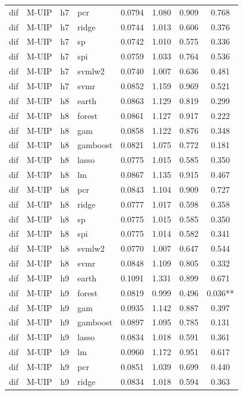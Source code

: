\begin{ThreePartTable}
\begin{longtable}[t]{llclcccc}
dif & M-UIP & h7 & pcr & 0.0794 & 1.080 & 0.909 & 0.768\\
dif & M-UIP & h7 & ridge & 0.0744 & 1.013 & 0.606 & 0.376\\
dif & M-UIP & h7 & sp & 0.0742 & 1.010 & 0.575 & 0.336\\
dif & M-UIP & h7 & spi & 0.0759 & 1.033 & 0.764 & 0.536\\
dif & M-UIP & h7 & svmlw2 & 0.0740 & 1.007 & 0.636 & 0.481\\
dif & M-UIP & h7 & svmr & 0.0852 & 1.159 & 0.969 & 0.521\\
\addlinespace
dif & M-UIP & h8 & earth & 0.0863 & 1.129 & 0.819 & 0.299\\
dif & M-UIP & h8 & forest & 0.0861 & 1.127 & 0.917 & 0.222\\
dif & M-UIP & h8 & gam & 0.0858 & 1.122 & 0.876 & 0.348\\
dif & M-UIP & h8 & gamboost & 0.0821 & 1.075 & 0.772 & 0.181\\
dif & M-UIP & h8 & lasso & 0.0775 & 1.015 & 0.585 & 0.350\\
dif & M-UIP & h8 & lm & 0.0867 & 1.135 & 0.915 & 0.467\\
dif & M-UIP & h8 & pcr & 0.0843 & 1.104 & 0.909 & 0.727\\
dif & M-UIP & h8 & ridge & 0.0777 & 1.017 & 0.598 & 0.358\\
dif & M-UIP & h8 & sp & 0.0775 & 1.015 & 0.585 & 0.350\\
dif & M-UIP & h8 & spi & 0.0775 & 1.014 & 0.582 & 0.341\\
dif & M-UIP & h8 & svmlw2 & 0.0770 & 1.007 & 0.647 & 0.544\\
dif & M-UIP & h8 & svmr & 0.0848 & 1.109 & 0.805 & 0.332\\
\addlinespace
dif & M-UIP & h9 & earth & 0.1091 & 1.331 & 0.899 & 0.671\\
dif & M-UIP & h9 & forest & 0.0819 & 0.999 & 0.496 & 0.036**\\
dif & M-UIP & h9 & gam & 0.0935 & 1.142 & 0.887 & 0.397\\
dif & M-UIP & h9 & gamboost & 0.0897 & 1.095 & 0.785 & 0.131\\
dif & M-UIP & h9 & lasso & 0.0834 & 1.018 & 0.591 & 0.361\\
dif & M-UIP & h9 & lm & 0.0960 & 1.172 & 0.951 & 0.617\\
dif & M-UIP & h9 & pcr & 0.0851 & 1.039 & 0.699 & 0.440\\
dif & M-UIP & h9 & ridge & 0.0834 & 1.018 & 0.594 & 0.363\\

\end{longtable}
\end{ThreePartTable}
